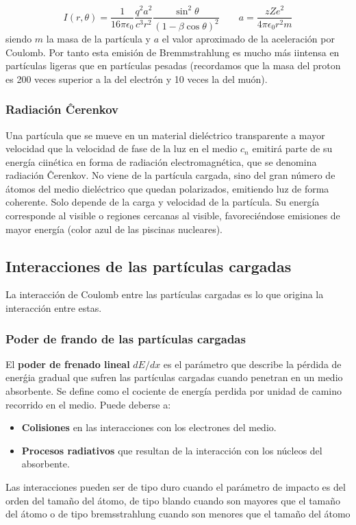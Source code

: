 \begin{equation}
    I(r,\theta) = \frac{1}{16 \pi \epsilon_0}  \frac{q^2 a^2}{c^3 r^2} \frac{\sin^2 \theta}{(1-\beta \cos \theta)^2} \qquad a = \frac{zZe^2}{4\pi \epsilon_0 r^2 m} 
\end{equation}
siendo $m$ la masa de la partícula y $a$ el valor aproximado de la aceleración por Coulomb. Por tanto esta emisión de Bremmstrahlung es mucho más iintensa en partículas ligeras que en partículas pesadas (recordamos que la masa del proton es 200 veces superior a la del electrón y 10 veces la del muón). 

\subsubsection{Radiación Ĉerenkov}

Una partícula que se mueve en un material dieléctrico transparente a mayor velocidad que la velocidad de fase de la luz en el medio $c_n$ emitirá parte de su energía ciinética en forma de radiación electromagnética, que se denomina radiación Ĉerenkov. No viene de la partícula cargada, sino del gran número de átomos del medio dieléctrico que quedan polarizados, emitiendo luz de forma coherente. Solo depende de la carga y velocidad de la partícula. Su energía corresponde al visible o regiones cercanas al visible, favoreciéndose emisiones de mayor energía (color azul de las piscinas nucleares).

\subsection{Interacciones de las partículas cargadas}


La interacción de Coulomb entre las partículas cargadas es lo que origina la interacción entre estas. 

\subsubsection{Poder de frando de las partículas cargadas}

El \textbf{poder de frenado lineal} $d E / d x$ es el parámetro que describe la pérdida de enerǵia gradual que sufren las partículas cargadas cuando penetran en un medio absorbente. Se define como el cociente de energía perdida por unidad de camino recorrido en el medio. Puede deberse a: 

\begin{itemize}
    \item \textbf{Colisiones} en las interacciones con los electrones del medio.
    \item \textbf{Procesos radiativos} que resultan de la interacción con los núcleos del absorbente. 
\end{itemize}
Las interacciones pueden ser de tipo duro cuando el parámetro de impacto es del orden del tamaño del átomo, de tipo blando cuando son mayores que el tamaño del átomo o de tipo bremsstrahlung cuando son menores que el tamaño del átomo

